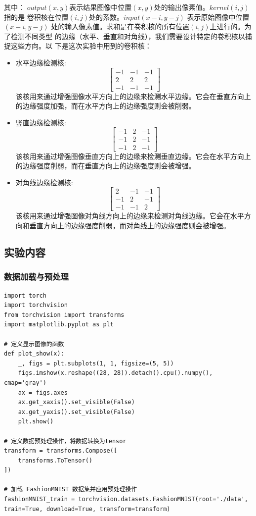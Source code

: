 \documentclass[a4paper,12pt]{article}
\begin{document}
其中：
$output(x, y)$表示结果图像中位置$(x, y)$处的输出像素值。$kernel(i, j)$指的是
卷积核在位置$(i, j)$处的系数。$input(x−i, y−j)$ 表示原始图像中位置$(x−i, y−j)$
处的输入像素值。求和是在卷积核的所有位置$(i, j)$上进行的。为了检测不同类型
的边缘（水平、垂直和对角线），我们需要设计特定的卷积核以捕捉这些方向。以
下是这次实验中用到的卷积核：
\begin{itemize}
  \item 水平边缘检测核:
  \[
  \begin{bmatrix}
    -1 & -1 & -1 \\
     2 &  2 &  2 \\
    -1 & -1 & -1
  \end{bmatrix}
  \]
  该核用来通过增强图像水平方向上的边缘来检测水平边缘。它会在垂直方向上的边缘强度加强，而在水平方向上的边缘强度则会被削弱。

  \item 竖直边缘检测核:
  \[
  \begin{bmatrix}
    -1 &  2 & -1 \\
    -1 &  2 & -1 \\
    -1 &  2 & -1
  \end{bmatrix}
  \]
  该核用来通过增强图像垂直方向上的边缘来检测垂直边缘。它会在水平方向上的边缘强度削弱，而在垂直方向上的边缘强度则会被增强。

  \item 对角线边缘检测核:
  \[
  \begin{bmatrix}
     2 & -1 & -1 \\
    -1 &  2 & -1 \\
    -1 & -1 &  2
  \end{bmatrix}
  \]
  该核用来通过增强图像对角线方向上的边缘来检测对角线边缘。它会在水平方向和垂直方向上的边缘强度削弱，而对角线上的边缘强度则会被增强。
\end{itemize}

\subsection{实验内容}
\subsubsection{数据加载与预处理}
\begin{lstlisting}
import torch
import torchvision
from torchvision import transforms
import matplotlib.pyplot as plt

# 定义显示图像的函数
def plot_show(x):
    _, figs = plt.subplots(1, 1, figsize=(5, 5))
    figs.imshow(x.reshape((28, 28)).detach().cpu().numpy(), cmap='gray')
    ax = figs.axes
    ax.get_xaxis().set_visible(False)
    ax.get_yaxis().set_visible(False)
    plt.show()

# 定义数据预处理操作，将数据转换为tensor
transform = transforms.Compose([
    transforms.ToTensor()
])

# 加载 FashionMNIST 数据集并应用预处理操作
fashionMNIST_train = torchvision.datasets.FashionMNIST(root='./data', train=True, download=True, transform=transform)
\end{lstlisting}
\end{document}
